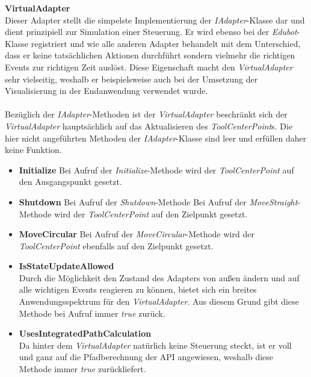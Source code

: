 \textbf{VirtualAdapter}\\
Dieser Adapter stellt die simpelste Implementierung der \textit{IAdapter}-Klasse dar und dient prinzipiell zur Simulation einer Steuerung. Er wird ebenso bei der \textit{Edubot}-Klasse registriert und wie alle anderen Adapter behandelt mit dem Unterschied, dass er keine tatsächlichen Aktionen durchführt sondern vielmehr die richtigen Events zur richtigen Zeit auslöst. Diese Eigenschaft macht den \textit{VirtualAdapter} sehr vielseitig, weshalb er beispielsweise auch bei der Umsetzung der Visualisierung in der Endanwendung verwendet wurde.\\
\\
Bezüglich der \textit{IAdapter}-Methoden ist der \textit{VirtualAdapter} beschränkt sich der \textit{VirtualAdapter} hauptsächlich auf das Aktualisieren des \textit{ToolCenterPoint}s. Die hier nicht angeführten Methoden der \textit{IAdapter}-Klasse sind leer und erfüllen daher keine Funktion.
\begin{itemize}
\item \textbf{Initialize}
\newline
Bei Aufruf der \textit{Initialize}-Methode wird der \textit{ToolCenterPoint} auf den Ausgangspunkt gesetzt.
\newpage
\item \textbf{Shutdown}
\newline
Bei Aufruf der \textit{Shutdown}-Methode 
\newline
Bei Aufruf der \textit{MoveStraight}-Methode wird der \textit{ToolCenterPoint} auf den Zielpunkt gesetzt.
\item \textbf{MoveCircular}
\newline
Bei Aufruf der \textit{MoveCircular}-Methode wird der \textit{ToolCenterPoint} ebenfalls auf den Zielpunkt gesetzt.
\item \textbf{IsStateUpdateAllowed}\\
Durch die Möglichkeit den Zustand des Adapters von außen ändern und auf alle wichtigen Events reagieren zu können, bietet sich ein breites Anwendungsspektrum für den \textit{VirtualAdapter}. Aus diesem Grund gibt diese Methode bei Aufruf immer \textit{true} zurück.
\item \textbf{UsesIntegratedPathCalculation}\\
Da hinter dem \textit{VirtualAdapter} natürlich keine Steuerung steckt, ist er voll und ganz auf die Pfadberechnung der API angewiesen, weshalb diese Methode immer \textit{true} zurückliefert.
\end{itemize}



